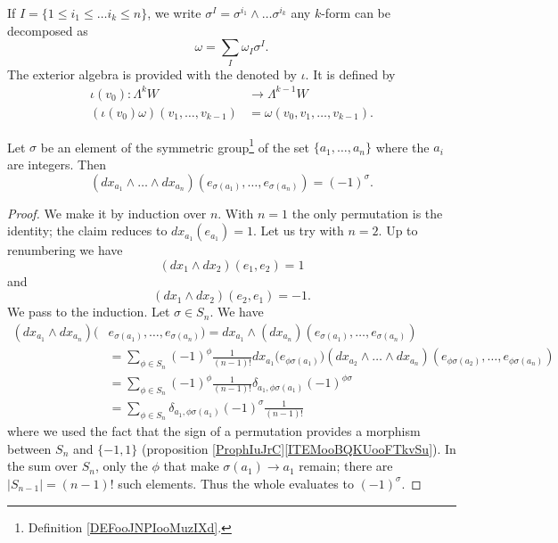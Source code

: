 If $I=\{1\leq i_1\leq\ldots i_k\leq n\}$, we write $\sigma^I=\sigma^{i_1}\wedge\ldots\sigma^{i_k}$ any $k$-form can be decomposed as
\[
  \omega=\sum_{I}\omega_I\sigma^I.
\]
The exterior algebra is provided with the  denoted by $\iota$. It is defined by\label{pg_DefProdExt}
\begin{equation}
\begin{aligned}
 \iota(v_0)\colon\Lambda^kW&\to \Lambda^{k-1}W \\ 
(\iota(v_0)\omega)(v_1,\ldots,v_{k-1})& =\omega(v_0,v_1,\ldots,v_{k-1}).
\end{aligned}
\end{equation}

\begin{lemma}
    Let \( \sigma\) be an element of the symmetric group\footnote{Definition \ref{DEFooJNPIooMuzIXd}.} of the set \( \{ a_1,\ldots, a_n \}\) where the \( a_i\) are integers. Then
    \begin{equation}
        (dx_{a_1}\wedge\ldots \wedge dx_{a_n})(e_{\sigma(a_1)},\ldots, e_{\sigma(a_n)})=(-1)^{\sigma}.
    \end{equation}
\end{lemma}

\begin{proof}
    We make it by induction over \( n\). With \( n=1\) the only permutation is the identity; the claim reduces to \( dx_{a_1}(e_{a_1})=1\). Let us try with \( n=2\). Up to renumbering we have
    \begin{equation}
        (dx_1\wedge dx_2)(e_1,e_2)=1
    \end{equation}
    and
    \begin{equation}
        (dx_1\wedge dx_2)(e_2,e_1)=-1.
    \end{equation}
    We pass to the induction. Let \( \sigma\in S_n\). We have
    \begin{subequations}
        \begin{align}
            (dx_{a_1}\wedge dx_{a_n})(&e_{\sigma(a_1)},\ldots, e_{\sigma(a_n)})=dx_{a_1}\wedge (dx_{a_n})(e_{\sigma(a_1)},\ldots, e_{\sigma(a_n)})\\
            &=\sum_{\phi\in S_n}(-1)^{\phi}\frac{1}{ (n-1)! }dx_{a_1}\big( e_{\phi\sigma(a_1)} \big)(dx_{a_2}\wedge\ldots\wedge dx_{a_n})(e_{\phi\sigma(a_2)},\ldots, e_{\phi\sigma(a_n)})\\
            &=\sum_{\phi\in S_n}(-1)^{\phi}\frac{1}{ (n-1)! }\delta_{a_1,\phi\sigma(a_1)}(-1)^{\phi\sigma}\\
            &=\sum_{\phi\in S_n}\delta_{a_1,\phi\sigma(a_1)}(-1)^{\sigma}\frac{1}{ (n-1)! }
        \end{align}
    \end{subequations}
    where we used the fact that the sign of a permutation provides a morphism between \( S_n\) and \( \{ -1,1 \}\) (proposition \ref{ProphIuJrC}\ref{ITEMooBQKUooFTkvSu}). In the sum over \( S_n\), only the \( \phi\) that make \( \sigma(a_1)\to a_1\) remain; there are \( | S_{n-1} |=(n-1)!\) such elements. Thus the whole evaluates to \( (-1)^{\sigma}\).
\end{proof}

